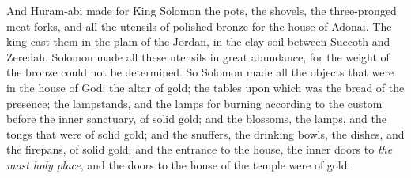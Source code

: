 \begin{biblechapter}
\verse And Huram-abi made for King Solomon the pots, the shovels, the three-pronged meat forks, and all the utensils of polished bronze for the house of Adonai.
\verse The king cast them in the plain of the Jordan, in the clay soil between Succoth and Zeredah.
\verse Solomon made all these utensils in great abundance, for the weight of the bronze could not be determined.
\verse So Solomon made all the objects that were in the house of God: the altar of gold; the tables upon which was the bread of the presence;
\verse the lampstands, and the lamps for burning according to the custom before the inner sanctuary, of solid gold;
\verse and the blossoms, the lamps, and the tongs that were of solid gold;
\verse and the snuffers, the drinking bowls, the dishes, and the firepans, of solid gold; and the entrance to the house, the inner doors to \textit{the most holy place}, and the doors to the house of the temple were of gold.
\end{biblechapter}

